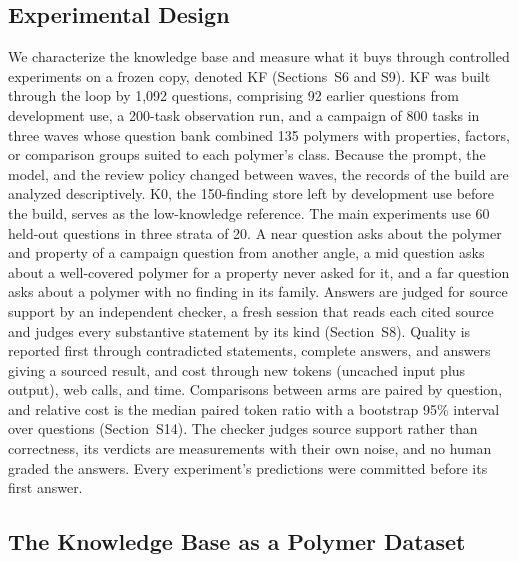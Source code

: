 \documentclass[journal=mamobx,manuscript=article]{achemso}
\begin{document}
\subsection{Experimental Design}
\label{sec:design}

We characterize the knowledge base and measure what it buys through controlled experiments on a frozen copy, denoted KF (Sections~S6 and S9).
KF was built through the loop by 1,092 questions, comprising 92 earlier questions from development use, a 200-task observation run, and a campaign of 800 tasks in three waves whose question bank combined 135 polymers with properties, factors, or comparison groups suited to each polymer's class.
Because the prompt, the model, and the review policy changed between waves, the records of the build are analyzed descriptively.
K0, the 150-finding store left by development use before the build, serves as the low-knowledge reference.
The main experiments use 60 held-out questions in three strata of 20.
A near question asks about the polymer and property of a campaign question from another angle, a mid question asks about a well-covered polymer for a property never asked for it, and a far question asks about a polymer with no finding in its family.
Answers are judged for source support by an independent checker, a fresh session that reads each cited source and judges every substantive statement by its kind (Section~S8).
Quality is reported first through contradicted statements, complete answers, and answers giving a sourced result, and cost through new tokens (uncached input plus output), web calls, and time.
Comparisons between arms are paired by question, and relative cost is the median paired token ratio with a bootstrap 95\% interval over questions (Section~S14).
The checker judges source support rather than correctness, its verdicts are measurements with their own noise, and no human graded the answers.
Every experiment's predictions were committed before its first answer.

\subsection{The Knowledge Base as a Polymer Dataset}
\label{sec:dataset}
\end{document}
